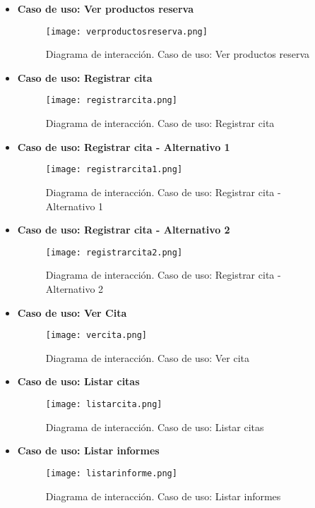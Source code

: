 \begin{itemize}
\item \textbf{Caso de uso: Ver productos reserva}
\begin{figure}[!htb]
  \centering
    \texttt{[image: verproductosreserva.png]}
  \caption{Diagrama de interacción. Caso de uso:  Ver productos reserva}
  \label{a}
\end{figure}

\newpage

\item \textbf{Caso de uso: Registrar cita}
\begin{figure}[!htb]
  \centering
    \texttt{[image: registrarcita.png]}
  \caption{Diagrama de interacción. Caso de uso: Registrar cita}
  \label{a}
\end{figure}

\newpage
\item \textbf{Caso de uso: Registrar cita - Alternativo 1}
\begin{figure}[!htb]
  \centering
    \texttt{[image: registrarcita1.png]}
  \caption{Diagrama de interacción. Caso de uso: Registrar cita - Alternativo 1}
  \label{a}
\end{figure}

\newpage
\item \textbf{Caso de uso: Registrar cita - Alternativo 2}
\begin{figure}[!htb]
  \centering
    \texttt{[image: registrarcita2.png]}
  \caption{Diagrama de interacción. Caso de uso: Registrar cita - Alternativo 2}
  \label{a}
\end{figure}


\newpage
\item \textbf{Caso de uso: Ver Cita}
\begin{figure}[!htb]
  \centering
    \texttt{[image: vercita.png]}
  \caption{Diagrama de interacción. Caso de uso: Ver cita}
  \label{a}
\end{figure}

\item \textbf{Caso de uso: Listar citas}
\begin{figure}[!htb]
  \centering
  \texttt{[image: listarcita.png]}
  \caption{Diagrama de interacción. Caso de uso: Listar citas}
  \label{a}
\end{figure}

\item \textbf{Caso de uso: Listar informes}
\begin{figure}[!htb]
  \centering
  \texttt{[image: listarinforme.png]}
  \caption{Diagrama de interacción. Caso de uso: Listar informes}
  \label{a}
\end{figure}


\end{itemize}
